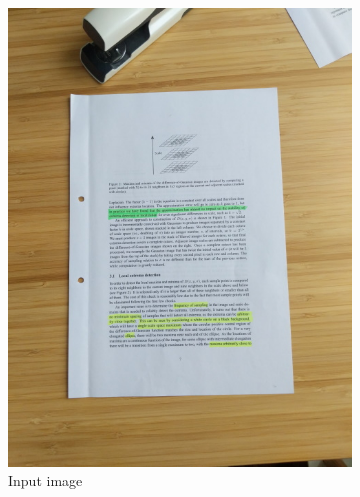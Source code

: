 \documentclass[bibliography=totoc]{scrartcl}
\begin{document}
\begin{figure}[ht!]
	\centering
	\begin{subfigure}[t]{0.28\linewidth}
		\includegraphics[width=\linewidth]{imgs/test/cluttered_desk.jpg}
		\caption{Input image}
		\label{subfig:input}
	\end{subfigure}
	\hspace{0.1\textwidth}
	\begin{subfigure}[t]{0.28\linewidth}

\end{subfigure}
\end{figure}
\end{document}
